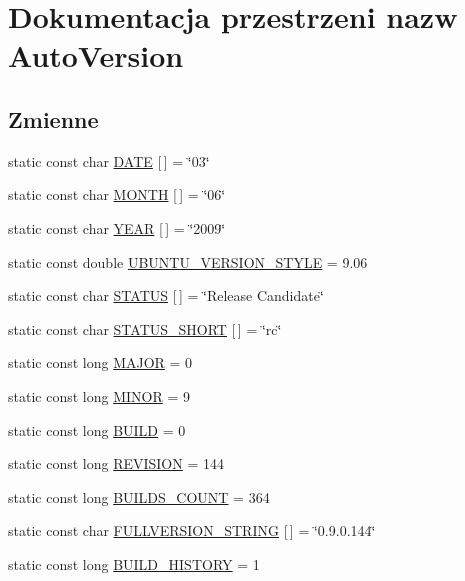 \hypertarget{a00019}{
\section{Dokumentacja przestrzeni nazw AutoVersion}
\label{dd/da2/a00019}
}
\subsection*{Zmienne}
\begin{CompactItemize}
\item 
static const char \hyperlink{a00019_76114a4076f4ae162ea5de4f97d1a597}{DATE} \mbox{[}$\,$\mbox{]} = \char`\"{}03\char`\"{}
\item 
static const char \hyperlink{a00019_c5504cfe250e5b6e09bde81a917c4349}{MONTH} \mbox{[}$\,$\mbox{]} = \char`\"{}06\char`\"{}
\item 
static const char \hyperlink{a00019_c6726fe1f27cfa5f70c5eb624c6095fc}{YEAR} \mbox{[}$\,$\mbox{]} = \char`\"{}2009\char`\"{}
\item 
static const double \hyperlink{a00019_06157f622b974a3180a91ffa5e4fc200}{UBUNTU\_\-VERSION\_\-STYLE} = 9.06
\item 
static const char \hyperlink{a00019_cb58e6df1058868fe3e780122ab30ef1}{STATUS} \mbox{[}$\,$\mbox{]} = \char`\"{}Release Candidate\char`\"{}
\item 
static const char \hyperlink{a00019_dc0aeb82b23e4fa3a91bc1f4d2ab0aed}{STATUS\_\-SHORT} \mbox{[}$\,$\mbox{]} = \char`\"{}rc\char`\"{}
\item 
static const long \hyperlink{a00019_85ad69390168fa80a3868ae22631b48c}{MAJOR} = 0
\item 
static const long \hyperlink{a00019_2c324b304c1d4c4d273f848c50679eb4}{MINOR} = 9
\item 
static const long \hyperlink{a00019_611dbb96b2f949b29627d8d714396911}{BUILD} = 0
\item 
static const long \hyperlink{a00019_e2d1fcdc67a4319c421677ebe1ef4d09}{REVISION} = 144
\item 
static const long \hyperlink{a00019_03e819549a8f22b45aacef6ac27de284}{BUILDS\_\-COUNT} = 364
\item 
static const char \hyperlink{a00019_2c666a4ee8f49f7647b06e6c526858ad}{FULLVERSION\_\-STRING} \mbox{[}$\,$\mbox{]} = \char`\"{}0.9.0.144\char`\"{}
\item 
static const long \hyperlink{a00019_cc483b25abe55f62bcf02496baf549dc}{BUILD\_\-HISTORY} = 1
\end{CompactItemize}


